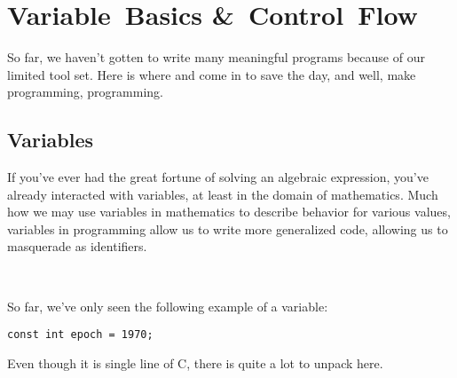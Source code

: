 %

\chapter{Variable~Basics \&~Control~Flow}

So far, we haven't gotten to write many meaningful programs because of
our limited tool set.  Here is where  and  come in to save the day, and well, make programming,
programming.

\section{Variables}

If you've ever had the great fortune of solving an algebraic expression,
you've already interacted with variables, at least in the domain of
mathematics.  Much how we may use variables in mathematics to describe
behavior for various values, variables in programming allow us to write
more generalized code, allowing us to masquerade  as
identifiers.

\

\noindent
So far, we've only seen the following example of a variable:

\begin{verbatim}
const int epoch = 1970;
\end{verbatim}

\noindent
Even though it is single line of C, there is quite a lot to unpack here.
